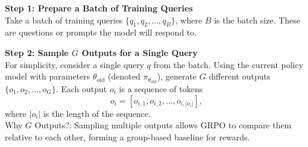 \documentclass{article}
\begin{document}
\noindent\textbf{Step 1: Prepare a Batch of Training Queries} \\
Take a batch of training queries \( \{q_1, q_2, \dots, q_B\} \), where \( B \) is the batch size. These are questions or prompts the model will respond to.\\

\vspace{3mm}

\noindent\textbf{Step 2: Sample \( G \) Outputs for a Single Query} \\
For simplicity, consider a single query \( q \) from the batch. Using the current policy model with parameters \( \theta_{\text{old}} \) (denoted \( \pi_{\theta_{\text{old}}} \)), generate \( G \) different outputs \( \{o_1, o_2, \dots, o_G\} \). Each output \( o_i \) is a sequence of tokens 
\[
o_i = [o_{i,1}, o_{i,2}, \dots, o_{i,|o_i|}],
\]
where \( |o_i| \) is the length of the sequence.\\[1mm]
Why \( G \) Outputs?: Sampling multiple outputs allows GRPO to compare them relative to each other, forming a group-based baseline for rewards.

\vspace{3mm}
\end{document}
